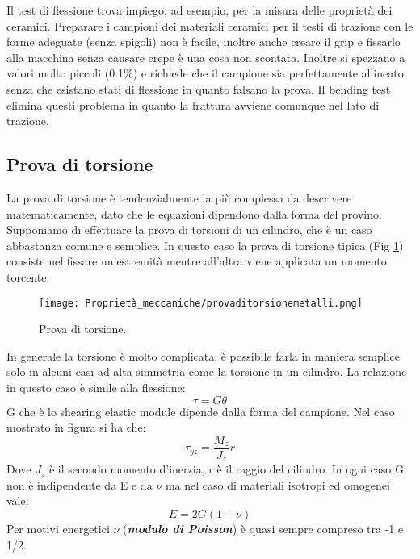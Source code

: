Il test di flessione trova impiego, ad esempio, per la misura delle proprietà dei ceramici. Preparare i campioni dei materiali ceramici per il testi di trazione con le forme adeguate (senza spigoli) non è facile, inoltre anche creare il grip e fissarlo alla macchina senza causare crepe è una cosa non scontata. 
Inoltre si spezzano a valori molto piccoli (0.1\%) e richiede che il campione sia perfettamente allineato senza che esistano stati di flessione in quanto falsano la prova. Il bending test elimina questi problema in quanto la frattura avviene comunque nel lato di trazione.

\subsection{Prova di torsione}

La prova di torsione è tendenzialmente la più complessa da descrivere matematicamente, dato che le equazioni dipendono dalla forma del provino.
Supponiamo di effettuare la prova di torsioni di un cilindro, che è un caso abbastanza comune e semplice. In questo caso la prova di torsione tipica (Fig \ref{prova di torsione}) consiste nel fissare un'estremità mentre all'altra viene applicata un momento torcente.

\begin{figure}[h]
    \centering
    \texttt{[image: Proprietà\_meccaniche/provaditorsionemetalli.png]}
    \caption{Prova di torsione.}
    \label{prova di torsione}
\end{figure}

In generale la torsione è molto complicata, è possibile farla in maniera semplice solo in alcuni casi ad alta simmetria come la torsione in un cilindro.
La relazione in questo caso è simile alla flessione:
\begin{equation}
    \tau=G\theta
\end{equation}
G che è lo shearing elastic module dipende dalla forma del campione. Nel caso mostrato in figura si ha che:
\begin{equation}
    \tau_{yz}=\frac{M_z}{J_z}r
\end{equation}
Dove $J_z$ è il secondo momento d'inerzia, r è il raggio del cilindro. In ogni caso G non è indipendente da E e da $\nu$ ma nel caso di materiali isotropi ed omogenei vale:
\begin{equation}
    E=2G(1+\nu)
\end{equation}
Per motivi energetici $\nu$ (\textbf{\textit{modulo di Poisson}}) è quasi sempre compreso tra -1 e 1/2.



